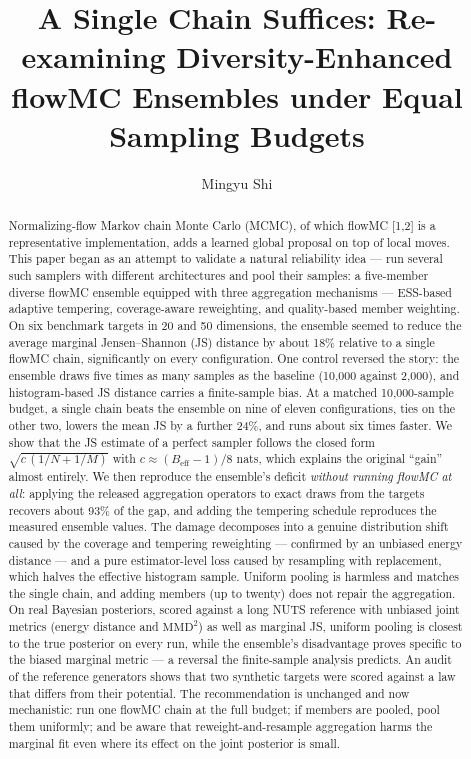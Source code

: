 \documentclass[11pt]{article}
\title{\textbf{A Single Chain Suffices: Re-examining Diversity-Enhanced
flowMC Ensembles under Equal Sampling Budgets}}
\author[1]{Mingyu Shi}
\affil[1]{Independent Researcher}
\date{}
\begin{document}
\maketitle

\begin{abstract}
\noindent
Normalizing-flow Markov chain Monte Carlo (MCMC), of which flowMC [1,2] is a
representative implementation, adds a learned global proposal on top of local
moves. This paper began as an attempt to validate a natural reliability idea
--- run several such samplers with different architectures and pool their
samples: a five-member diverse flowMC ensemble equipped with
three aggregation mechanisms --- ESS-based adaptive tempering, coverage-aware
reweighting, and quality-based member weighting. On six benchmark targets in
20 and 50 dimensions, the ensemble seemed to reduce the average marginal
Jensen--Shannon (JS) distance by about 18\% relative to a single flowMC chain,
significantly on every configuration. One control reversed the story: the
ensemble draws five times as many samples as the baseline (10{,}000 against
2{,}000), and histogram-based JS distance carries a finite-sample bias. At a
matched 10{,}000-sample budget, a single chain beats the ensemble on nine of
eleven configurations, ties on the other two, lowers the mean JS by a further
24\%, and runs about six times faster. We show that the JS estimate of a
perfect sampler follows the closed form $\sqrt{c\,(1/N+1/M)}$ with
$c\approx(B_{\mathrm{eff}}-1)/8$ nats, which explains the original ``gain''
almost entirely. We then reproduce the ensemble's deficit \emph{without
running flowMC at all}: applying the released aggregation operators to exact
draws from the targets recovers about 93\% of the gap, and adding the
tempering schedule reproduces the measured ensemble values. The damage decomposes into a genuine distribution shift
caused by the coverage and tempering reweighting --- confirmed by an unbiased
energy distance --- and a pure estimator-level loss caused by resampling with
replacement, which halves the effective histogram sample. Uniform pooling is
harmless and matches the single chain, and adding members (up to twenty) does
not repair the aggregation. On real Bayesian posteriors, scored against a long
NUTS reference with unbiased joint metrics (energy distance and $\mathrm{MMD}^2$)
as well as marginal JS, uniform pooling is closest to the true posterior on
every run, while the ensemble's disadvantage proves specific to the biased
marginal metric --- a reversal the finite-sample analysis predicts. An audit of
the reference generators shows that two synthetic targets were scored against
a law that differs from their potential. The recommendation is unchanged and now
mechanistic: run one flowMC chain at the full budget; if members are pooled,
pool them uniformly; and be aware that reweight-and-resample aggregation harms
the marginal fit even where its effect on the joint posterior is small.
\end{abstract}
\end{document}

